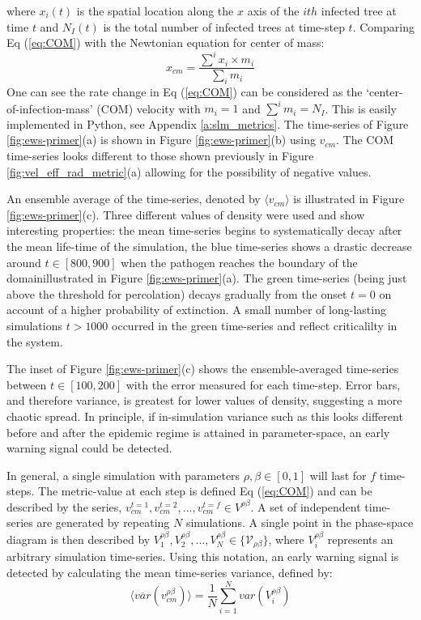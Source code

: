 where $x_i(t)$ is the spatial location along the $x$ axis of the $ith$ infected tree at %
time $t$ and $N_I(t)$ is the total number of infected trees at time-step $t$. %
Comparing Eq (\ref{eq:COM}) with the Newtonian equation for center of mass: %
\begin{equation}
    x_{cm} = \frac{\sum^i x_i\times m_i}{\sum_i m_i}
\end{equation}
One can see the rate change in Eq (\ref{eq:COM}) can be considered as the `center-of-infection-mass' (COM) velocity %
with $m_i=1$ and $\sum^im_i= N_I$. %
This is easily implemented in Python, see Appendix \ref{a:slm_metrics}. %
The time-series of Figure \ref{fig:ews-primer}(a) is shown in Figure \ref{fig:ews-primer}(b) using $v_{cm}$. %
The COM time-series looks different to those shown previously in Figure \ref{fig:vel_eff_rad_metric}(a) allowing for the possibility of negative values. %

An ensemble average of the time-series, denoted by $\langle v_{cm}\rangle$ is illustrated in Figure \ref{fig:ews-primer}(c). %
Three different values of density were used and show  interesting properties: %
the mean time-series begins to systematically decay after the mean life-time of the simulation, %
the blue time-series shows a drastic decrease around $t \in [800, 900]$ when the pathogen %
reaches the boundary of the domain\textemdash illustrated in Figure \ref{fig:ews-primer}(a). %
The green time-series (being just above the threshold for percolation) decays gradually from %
the onset $t=0$ on account of a higher probability of extinction. %
A small number of long-lasting simulations $t>1000$ occurred in the green time-series and reflect criticalilty in the system. %

The inset of Figure \ref{fig:ews-primer}(c) shows the ensemble-averaged time-series between %
$t\in [100, 200]$ with the error measured for each time-step. Error bars, and therefore variance, %
is greatest for lower values of density, suggesting a more chaotic spread. %
In principle, if in-simulation variance such as this looks different before and %
after the epidemic regime is attained in parameter-space, an early warning signal could be detected. %

In general, a single simulation with parameters $\rho, \beta \in [0, 1]$ will last for $f$ time-steps. %
The metric-value at each step is defined Eq (\ref{eq:COM}) and can be described by the series, $v_{cm}^{t=1}, v_{cm}^{t=2},..., v_{cm}^{t=f} \in V^{\rho\beta}$. %
A set of independent time-series are generated by repeating $N$ simulations. %
A single point in the phase-space diagram is then described by $V_1^{\rho\beta}, V_2^{\rho \beta},..., V_N^{\rho\beta} \in \{\mathcal{V}_{\rho\beta}\}$, %
where $V_i^{\rho\beta}$ represents an arbitrary simulation time-series. %
Using this notation, an early warning signal is detected by calculating the mean time-series variance, %
defined by:
\begin{equation}
\label{eq:ews_eq}
    \big\langle \overline{var}(v^{\rho\beta}_{cm}) \big\rangle = \frac{1}{N}\sum\limits_{i=1}^{N} var(V_i^{\rho\beta})
\end{equation}

